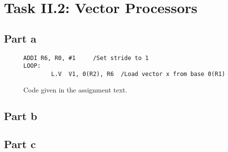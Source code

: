 \section{Task II.2: Vector Processors}

\subsection{Part a}
\begin{figure}[ht]
    \begin{lstlisting}[language={[x86masm]Assembler}]
        ADDI R6, R0, #1     /Set stride to 1
LOOP:
        L.V  V1, 0(R2), R6  /Load vector x from base 0(R1)

    \end{lstlisting}
    \caption{Code given in the assignment text.}
    \label{fig:t21code}
\end{figure}

\subsection{Part b}
\subsection{Part c}
